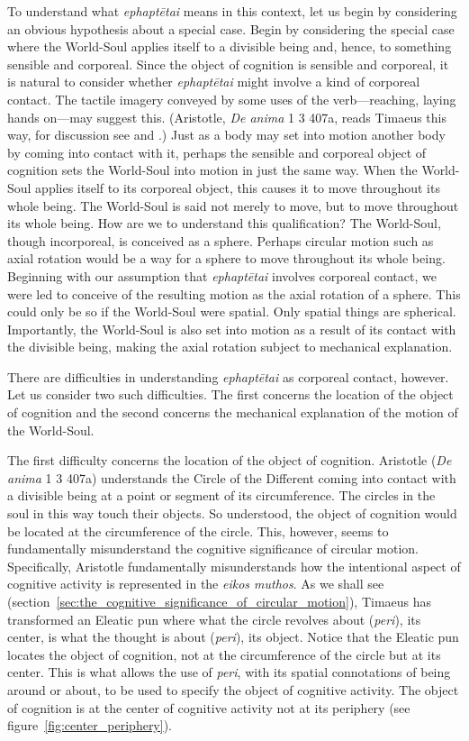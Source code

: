To understand what \emph{ephaptētai} means in this context, let us begin by considering an obvious hypothesis about a special case. Begin by considering the special case where the World-Soul applies itself to a divisible being and, hence, to something sensible and corporeal. Since the object of cognition is sensible and corporeal, it is natural to consider whether \emph{ephaptētai} might involve a kind of corporeal contact. The tactile imagery conveyed by some uses of the verb---reaching, laying hands on---may suggest this. (Aristotle, \emph{De anima} 1 3 407a, reads Timaeus this way, for discussion see \citealt[392--5, 404--7]{Cherniss:1944aa} and \citealt[82--6]{Lee:1976xs}.) Just as a body may set into motion another body by coming into contact with it, perhaps the sensible and corporeal object of cognition sets the World-Soul into motion in just the same way. When the World-Soul applies itself to its corporeal object, this causes it to move throughout its whole being. The World-Soul is said not merely to move, but to move throughout its whole being. How are we to understand this qualification? The World-Soul, though incorporeal, is conceived as a sphere. Perhaps circular motion such as axial rotation would be a way for a sphere to move throughout its whole being. Beginning with our assumption that \emph{ephaptētai} involves corporeal contact, we were led to conceive of the resulting motion as the axial rotation of a sphere. This could only be so if the World-Soul were spatial. Only spatial things are spherical. Importantly, the World-Soul is also set into motion as a result of its contact with the divisible being, making the axial rotation subject to mechanical explanation.

There are difficulties in understanding \emph{ephaptētai} as corporeal contact, however. Let us consider two such difficulties. The first concerns the location of the object of cognition and the second concerns the mechanical explanation of the motion of the World-Soul.

The first difficulty concerns the location of the object of cognition. Aristotle (\emph{De anima} 1 3 407a) understands the Circle of the Different coming into contact with a divisible being at a point or segment of its circumference. The circles in the soul in this way touch their objects. So understood, the object of cognition would be located at the circumference of the circle. This, however, seems to fundamentally misunderstand the cognitive significance of circular motion. Specifically, Aristotle fundamentally misunderstands how the intentional aspect of cognitive activity is represented in the \emph{eikos muthos}. As we shall see (section~\ref{sec:the_cognitive_significance_of_circular_motion}), Timaeus has transformed an Eleatic pun where what the circle revolves about (\emph{peri}), its center, is what the thought is about (\emph{peri}), its object. Notice that the Eleatic pun locates the object of cognition, not at the circumference of the circle but at its center. This is what allows the use of \emph{peri}, with its spatial connotations of being around or about, to be used to specify the object of cognitive activity. The object of cognition is at the center of cognitive activity not at its periphery (see figure~\ref{fig:center_periphery}).

